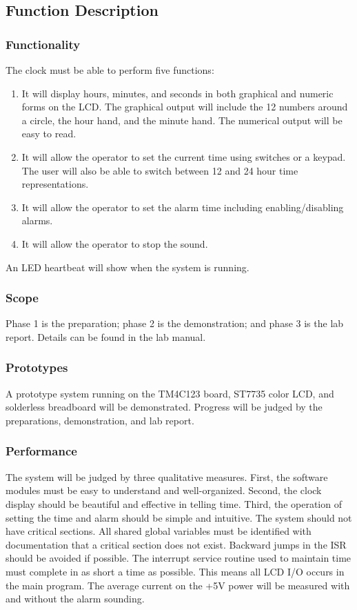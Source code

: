 \documentclass{article}
\begin{document}
	\subsection{Function Description}

		\subsubsection{Functionality}
			The clock must be able to perform five functions:
			\begin{enumerate}
				\item
					It will display hours, minutes, and seconds in both graphical and numeric forms on the LCD. The graphical output will include the 12 numbers around a circle, the hour hand, and the minute hand. The numerical output will be easy to read.
			
				\item
					It will allow the operator to set the current time using switches or a keypad. The user will also be able to switch between 12 and 24 hour time representations.
				
				\item
					It will allow the operator to set the alarm time including enabling/disabling alarms.
				
				\item
					It will allow the operator to stop the sound.				
			\end{enumerate}
			An LED heartbeat will show when the system is running.
	
		\subsubsection{Scope}
			Phase 1 is the preparation; phase 2 is the demonstration; and phase 3 is the lab report. Details can be found in the lab manual.
	
		\subsubsection{Prototypes}
			A prototype system running on the TM4C123 board, ST7735 color LCD, and solderless breadboard will be demonstrated. Progress will be judged by the preparations, demonstration, and lab report.
	
		\subsubsection{Performance}
			The system will be judged by three qualitative measures. First, the software modules must be easy to understand and well-organized. Second, the clock display should be beautiful and effective in telling time. Third, the operation of setting the time and alarm should be simple and intuitive. The system should not have critical sections. All shared global variables must be identified with documentation that a critical section does not exist. Backward jumps in the ISR should be avoided if possible. The interrupt service routine used to maintain time must complete in as short a time as possible. This means all LCD I/O occurs in the main program. The average current on the +5V power will be measured with and without the alarm sounding.
	
\end{document}
